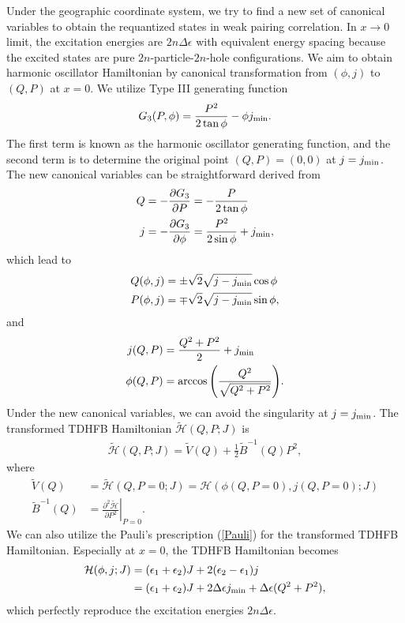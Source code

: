 \documentclass[11pt]{book} %
\begin{document}
Under the geographic coordinate system, we try to find a new set of canonical variables to obtain the requantized states in weak pairing correlation. 
In $x\to 0$ limit, the excitation energies are $2n\Delta\epsilon$ with equivalent energy spacing because the excited states are pure $2n$-particle-$2n$-hole 
configurations. 
We aim to obtain harmonic oscillator Hamiltonian by canonical transformation 
from $(\phi,j)$ to $(Q,P)$ at $x=0$. We utilize Type III generating function
\begin{align}
G_3(P,\phi) = \frac{P^2}{2\tan{\phi}} - \phi j_{\rm min} .
\end{align}
The first term is known as the harmonic oscillator generating function, 
and the second term is to determine the original point $(Q,P)=(0,0)$ at $j=j_{\rm min}$. 
The new canonical variables can be straightforward derived from
\begin{align}
  Q &= -\frac{\partial G_3}{\partial P} = -\frac{P}{2\tan{\phi}} \nonumber \\
  j &= -\frac{\partial G_3}{\partial \phi} = \frac{P^2}{2\sin{\phi}} + j_{\rm min}, \nonumber 
\end{align}
which lead to
\begin{align}
  Q(\phi, j) &= \pm \sqrt{2}\sqrt{j-j_{\rm min}} \cos{\phi} \nonumber \\
  P(\phi, j) &= \mp \sqrt{2}\sqrt{j-j_{\rm min}} \sin{\phi},
\label{QP}
\end{align}
and
\begin{align}
  j(Q,P) &= \frac{Q^2 + P^2}{2} + j_{\rm min} \nonumber \\
  \phi(Q,P) &= \arccos{\left( \frac{Q^2}{\sqrt{Q^2 + P^2}} \right)}.
\label{phij}
\end{align}
Under the new canonical variables, 
we can avoid the singularity at $j=j_{\rm min}$. The transformed TDHFB Hamiltonian $\tilde{\mathcal{H}}(Q,P;J)$ is
\begin{align}
  \tilde{\mathcal{H}}(Q,P;J) = \tilde{V}(Q) + \frac{1}{2}\tilde{B}^{-1}(Q)P^2, 
\end{align}
where
\begin{align}
  \tilde{V}(Q) &= \tilde{\mathcal{H}}(Q,P=0;J) = \mathcal{H}(\phi(Q,P=0), j(Q,P=0);J) \\
  \tilde{B}^{-1}(Q) &= \left. \frac{\partial^2 \tilde{\mathcal{H}}}{\partial P^2} \right|_{P=0} .
\end{align}
We can also utilize the Pauli's prescription (\ref{Pauli}) for the transformed TDHFB Hamiltonian. Especially at $x=0$, the TDHFB Hamiltonian becomes
\begin{align}
  \mathcal{H}(\phi,j;J) &= (\epsilon_1+\epsilon_2)J + 2(\epsilon_2-\epsilon_1)j \nonumber \\
  	&= (\epsilon_1+\epsilon_2)J + 2\Delta\epsilon j_{\rm min}
	+ \Delta\epsilon(Q^2+P^2),
\end{align}
which perfectly reproduce the excitation energies $2n\Delta\epsilon$.
\end{document}
